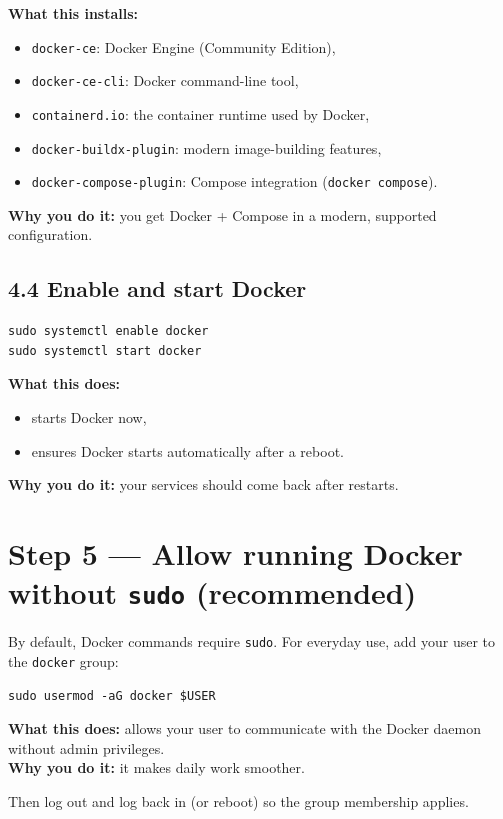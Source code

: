 \textbf{What this installs:}
\begin{itemize}[leftmargin=*]
  \item \texttt{docker-ce}: Docker Engine (Community Edition),
  \item \texttt{docker-ce-cli}: Docker command-line tool,
  \item \texttt{containerd.io}: the container runtime used by Docker,
  \item \texttt{docker-buildx-plugin}: modern image-building features,
  \item \texttt{docker-compose-plugin}: Compose integration (\texttt{docker compose}).
\end{itemize}

\textbf{Why you do it:} you get Docker + Compose in a modern, supported configuration.

\subsection{4.4 Enable and start Docker}
\begin{lstlisting}
sudo systemctl enable docker
sudo systemctl start docker
\end{lstlisting}

\textbf{What this does:}
\begin{itemize}[leftmargin=*]
  \item starts Docker now,
  \item ensures Docker starts automatically after a reboot.
\end{itemize}

\textbf{Why you do it:} your services should come back after restarts.

\section{Step 5 --- Allow running Docker without \texttt{sudo} (recommended)}
By default, Docker commands require \texttt{sudo}. For everyday use, add your user to the \texttt{docker} group:

\begin{lstlisting}
sudo usermod -aG docker $USER
\end{lstlisting}

\textbf{What this does:} allows your user to communicate with the Docker daemon without admin privileges. \\
\textbf{Why you do it:} it makes daily work smoother.

Then log out and log back in (or reboot) so the group membership applies.

